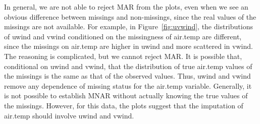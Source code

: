 \documentclass[article]{jss}
\begin{document}
In general, we are not able to reject MAR from the plots, even when we see an obvious difference between missings and non-missings, since the real values of the missings are not available. For example, in Figure~\ref{fig:uvwind}, the distributions of uwind and vwind conditioned on the missingness of air.temp are different, since the missings on air.temp are higher in uwind and more scattered in vwind. The reasoning is complicated, but we cannot reject MAR. It is possible that, conditional on uwind and vwind, that the distribution of true air.temp values of the missings is the same as that of the observed values. Thus, uwind and vwind remove any dependence of missing status for the air.temp variable. Generally, it is not possible to establish MNAR without actually knowing the true values of the missings. However, for this data, the plots suggest that the imputation of air.temp should involve uwind and vwind.
\end{document}
